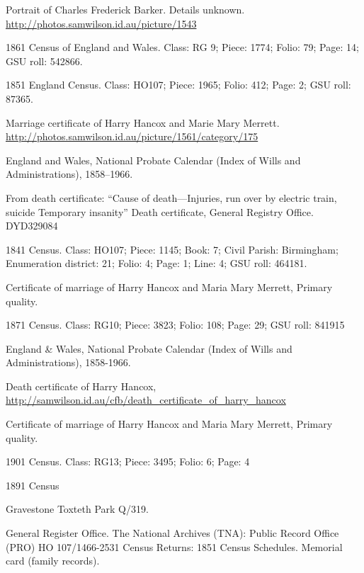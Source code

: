 \begin{thebibliography}{99}
	Portrait of Charles Frederick Barker. Details unknown.
	\url{http://photos.samwilson.id.au/picture/1543}

	1861 Census of England and Wales.
	Class: RG 9; Piece: 1774; Folio: 79; Page: 14; GSU roll: 542866.

	1851 England Census.
	Class: HO107; Piece: 1965; Folio: 412; Page: 2; GSU roll: 87365.

	Marriage certificate of Harry Hancox and Marie Mary Merrett.
	\url{http://photos.samwilson.id.au/picture/1561/category/175}

	England and Wales, National Probate Calendar (Index of Wills and Administrations), 1858--1966.

	From death certificate: ``Cause of death---Injuries, run over by electric train, suicide Temporary insanity''
	Death certificate, General Registry Office. DYD329084

	1841 Census.
	Class: HO107; Piece: 1145; Book: 7; Civil Parish: Birmingham; Enumeration district: 21; Folio: 4; Page: 1; Line: 4; GSU roll: 464181.

	Certificate of marriage of Harry Hancox and Maria Mary Merrett, Primary quality.

	1871 Census.
	Class: RG10; Piece: 3823; Folio: 108; Page: 29; GSU roll: 841915

	England \& Wales, National Probate Calendar (Index of Wills and Administrations), 1858-1966.

	Death certificate of Harry Hancox,
	\url{http://samwilson.id.au/cfb/death_certificate_of_harry_hancox}

	Certificate of marriage of Harry Hancox and Maria Mary Merrett, Primary quality.

	1901 Census.
	Class: RG13; Piece: 3495; Folio: 6; Page: 4

	1891 Census

	Gravestone Toxteth Park Q/319.

	General Register Office. The National Archives (TNA): Public Record Office (PRO) HO 107/1466-2531 Census Returns: 1851 Census Schedules.
	Memorial card (family records).


\end{thebibliography}
